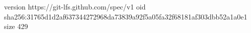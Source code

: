 version https://git-lfs.github.com/spec/v1
oid sha256:31765d1d2af637344272968da73839a92f5a05fa32f68181af303dbb52a1a0e1
size 429
